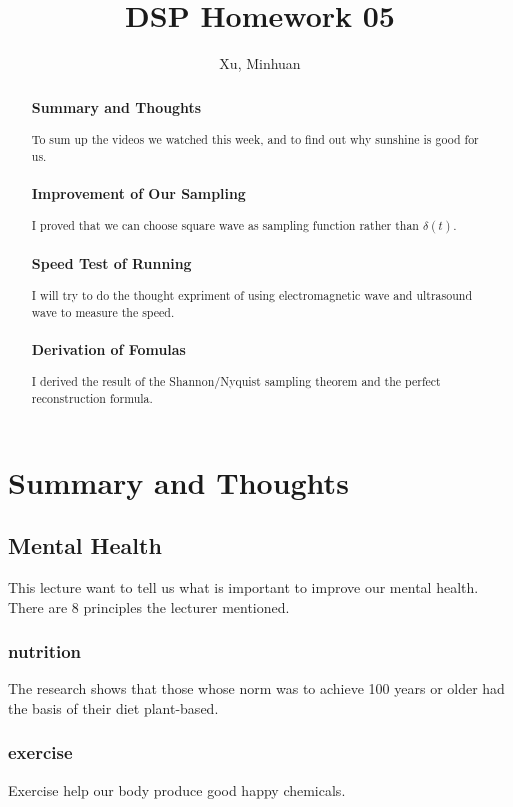 \documentclass{article}
\begin{document}
\title{DSP Homework 05}
\author{Xu, Minhuan}
\maketitle
\tableofcontents
\begin{abstract}
    \subsubsection*{Summary and Thoughts}
    To sum up the videos we watched this week, and to find out why sunshine is good for us.
    \subsubsection*{Improvement of Our Sampling}
    I proved that we can choose square wave as sampling function rather than $\delta(t)$.
    \subsubsection*{Speed Test of Running}
    I will try to do the thought expriment of using electromagnetic wave and ultrasound wave to measure the speed.
    \subsubsection*{Derivation of Fomulas}
    I derived the result of the Shannon/Nyquist sampling theorem and the perfect reconstruction formula.
\end{abstract}

\section{Summary and Thoughts}

\subsection{Mental Health}
This lecture want to tell us what is important to improve our mental health. There are 8 principles the lecturer mentioned.
\subsubsection*{nutrition}
The research shows that those whose norm was to achieve 100 years or older had the basis of their diet plant-based.
\subsubsection*{exercise}
Exercise help our body produce good happy chemicals.
\end{document}
